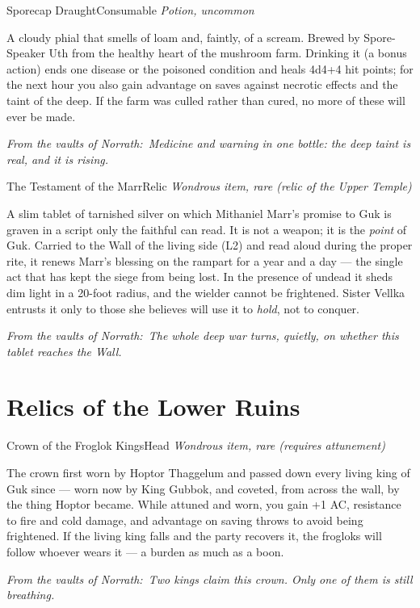 \documentclass[10pt,twoside]{report}
\newcommand{\itemtype}[1]{{\itshape #1}\par\vspace{2pt}{\color{gukgold!70!black}\rule{\linewidth}{0.6pt}}\par\vspace{2pt}}
\newcommand{\eqnote}[1]{\par\vspace{3pt}{\color{gukgold!70!black}\rule{\linewidth}{0.5pt}}\par
  {\footnotesize\itshape\color{gukstone}From the vaults of Norrath:~#1}\par}
\begin{document}
\begin{itemcard}{Sporecap Draught}{Consumable}
\itemtype{Potion, uncommon}
A cloudy phial that smells of loam and, faintly, of a scream. Brewed by Spore-Speaker Uth from the healthy heart of the mushroom farm. Drinking it (a bonus action) ends one disease or the poisoned condition and heals 4d4+4 hit points; for the next hour you also gain advantage on saves against necrotic effects and the taint of the deep. If the farm was culled rather than cured, no more of these will ever be made.
\eqnote{Medicine and warning in one bottle: the deep taint is real, and it is rising.}
\end{itemcard}

\begin{itemcard}{The Testament of the Marr}{Relic}
\itemtype{Wondrous item, rare (relic of the Upper Temple)}
A slim tablet of tarnished silver on which Mithaniel Marr's promise to Guk is graven in a script only the faithful can read. It is not a weapon; it is the \emph{point} of Guk. Carried to the Wall of the living side (L2) and read aloud during the proper rite, it renews Marr's blessing on the rampart for a year and a day --- the single act that has kept the siege from being lost. In the presence of undead it sheds dim light in a 20-foot radius, and the wielder cannot be frightened. Sister Vellka entrusts it only to those she believes will use it to \emph{hold}, not to conquer.
\eqnote{The whole deep war turns, quietly, on whether this tablet reaches the Wall.}
\end{itemcard}

\section{Relics of the Lower Ruins}

\begin{itemcard}{Crown of the Froglok Kings}{Head}
\itemtype{Wondrous item, rare (requires attunement)}
The crown first worn by Hoptor Thaggelum and passed down every living king of Guk since --- worn now by King Gubbok, and coveted, from across the wall, by the thing Hoptor became. While attuned and worn, you gain +1 AC, resistance to fire and cold damage, and advantage on saving throws to avoid being frightened. If the living king falls and the party recovers it, the frogloks will follow whoever wears it --- a burden as much as a boon.
\eqnote{Two kings claim this crown. Only one of them is still breathing.}
\end{itemcard}
\end{document}

